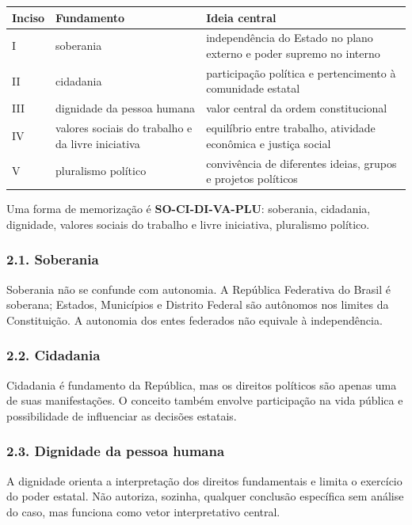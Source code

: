 \documentclass[11pt,a4paper]{article}
\begin{document}
\begin{tabularx}{\linewidth}{llX}
\toprule
 \textbf{Inciso} & \textbf{Fundamento} & \textbf{Ideia central} \\
\midrule
 I & soberania & independência do Estado no plano externo e poder supremo no interno \\
 II & cidadania & participação política e pertencimento à comunidade estatal \\
 III & dignidade da pessoa humana & valor central da ordem constitucional \\
 IV & valores sociais do trabalho e da livre iniciativa & equilíbrio entre trabalho, atividade econômica e justiça social \\
 V & pluralismo político & convivência de diferentes ideias, grupos e projetos políticos \\
\bottomrule
\end{tabularx}


Uma forma de memorização é \textbf{SO-CI-DI-VA-PLU}: soberania, cidadania, dignidade, valores sociais do trabalho e livre iniciativa, pluralismo político.

\subsubsection*{2.1. Soberania}

Soberania não se confunde com autonomia. A República Federativa do Brasil é soberana; Estados, Municípios e Distrito Federal são autônomos nos limites da Constituição. A autonomia dos entes federados não equivale à independência.

\subsubsection*{2.2. Cidadania}

Cidadania é fundamento da República, mas os direitos políticos são apenas uma de suas manifestações. O conceito também envolve participação na vida pública e possibilidade de influenciar as decisões estatais.

\subsubsection*{2.3. Dignidade da pessoa humana}

A dignidade orienta a interpretação dos direitos fundamentais e limita o exercício do poder estatal. Não autoriza, sozinha, qualquer conclusão específica sem análise do caso, mas funciona como vetor interpretativo central.
\end{document}
